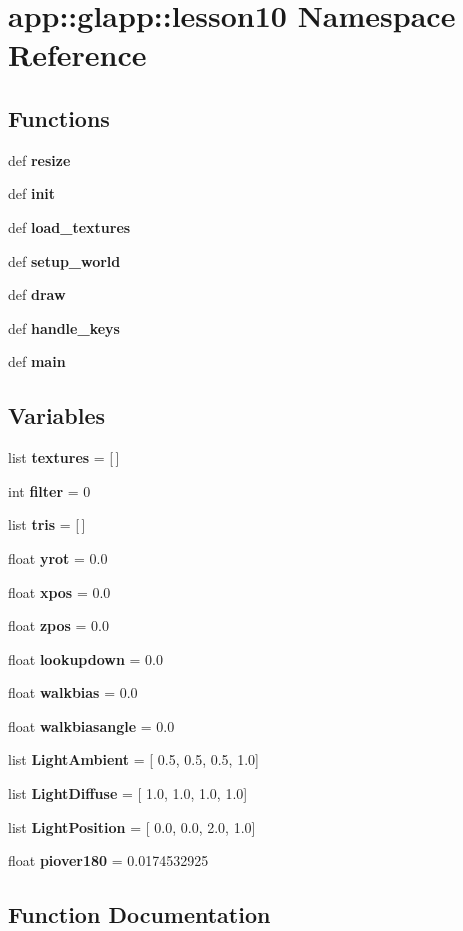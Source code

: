 \section{app::glapp::lesson10 Namespace Reference}
\label{namespaceapp_1_1glapp_1_1lesson10}


\subsection*{Functions}
\begin{CompactItemize}
\item 
def {\bf resize}
\item 
def {\bf init}
\item 
def {\bf load\_\-textures}
\item 
def {\bf setup\_\-world}
\item 
def {\bf draw}
\item 
def {\bf handle\_\-keys}
\item 
def {\bf main}
\end{CompactItemize}
\subsection*{Variables}
\begin{CompactItemize}
\item 
list {\bf textures} = [$\,$]
\item 
int {\bf filter} = 0
\item 
list {\bf tris} = [$\,$]
\item 
float {\bf yrot} = 0.0
\item 
float {\bf xpos} = 0.0
\item 
float {\bf zpos} = 0.0
\item 
float {\bf lookupdown} = 0.0
\item 
float {\bf walkbias} = 0.0
\item 
float {\bf walkbiasangle} = 0.0
\item 
list {\bf LightAmbient} = [ 0.5, 0.5, 0.5, 1.0]
\item 
list {\bf LightDiffuse} = [ 1.0, 1.0, 1.0, 1.0]
\item 
list {\bf LightPosition} = [ 0.0, 0.0, 2.0, 1.0]
\item 
float {\bf piover180} = 0.0174532925
\end{CompactItemize}


\subsection{Function Documentation}
